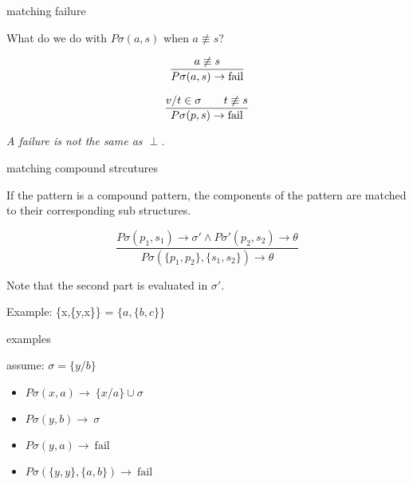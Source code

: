\begin{frame}{matching failure}

\pause\vspace{20pt} What do we do with $P\sigma(a,s)$ when $a \not\equiv s$?

\pause\vspace{20pt}

$$\frac{a \not\equiv s}{P\sigma(a, s) \rightarrow {\rm fail}}$$ 

\pause\vspace{20pt}

$$\frac{
v/t \in \sigma \qquad  t \not\equiv s
}{P\sigma(p, s) \rightarrow {\rm fail}}$$ 


{\em A failure is not the same as $\perp$.}
\end{frame}

\begin{frame}{matching compound strcutures}

If the pattern is a compound pattern, \pause the components of the pattern are matched to their corresponding sub structures.

\pause\vspace{10pt}

$$\frac{P\sigma(p_1, s_1) \rightarrow \sigma' \wedge P\sigma'(p_2, s_2) \rightarrow \theta}{P\sigma(\lbrace p_1, p_2 \rbrace  , \lbrace s_1, s_2 \rbrace) \rightarrow \theta}$$


\pause \vspace{10pt}
Note that the second part is evaluated in $\sigma'$. 

\pause \vspace{10pt}Example: \{x,\{y,x\}\} = $\{a, \{b,c\}\}$

\vspace{20pt}{\em Match a compund pattern with anyting but a compound structure will fail.}

\end{frame}

\begin{frame}{examples}

assume: $\sigma = \lbrace y/b\rbrace$

\begin{itemize}
  \pause\item $P\sigma(x , a) \rightarrow $\pause $\ \lbrace x/a \rbrace  \cup \sigma$
  \pause\item $P\sigma(y , b) \rightarrow $\pause $\ \sigma$
  \pause\item $P\sigma(y , a) \rightarrow $\pause  $\ \mathrm{fail}$
  \pause\item $P\sigma(\lbrace y, y\rbrace , \lbrace a, b \rbrace) \rightarrow $\pause $\ \mathrm{fail}$
\end{itemize}

\end{frame}

